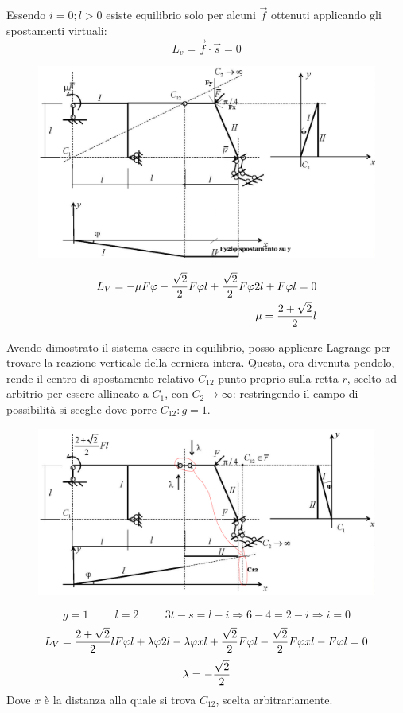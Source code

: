 \documentclass{article}
\begin{document}
\begin{adjustwidth}{2in}{}
 Essendo $i = 0; l>0$ esiste equilibrio solo per alcuni $\vec{f}$ ottenuti applicando gli spostamenti virtuali: 
 \[L_v = \vec{f}\cdot\vec{s} = 0\]
 
 \begin{figure}[H]
 	\centering
 	\includegraphics[width=0.5\linewidth]{immagini/1.PARTE4_Pagina_21}
 \end{figure}
 
 \begin{eqnarray*} L_V = -\mu F\varphi - {\sqrt{2}\over2}F\varphi l + {\sqrt{2}\over2}F\varphi 2l + F\varphi l = 0 \\
 \mu = \dfrac{2+\sqrt{2}}{2}l 
\end{eqnarray*}

Avendo dimostrato il sistema essere in equilibrio, posso applicare Lagrange per trovare la reazione verticale della cerniera intera. 
\newpage
Questa, ora divenuta pendolo, rende il centro di spostamento relativo $C_{12}$ punto proprio sulla retta $r$, scelto ad arbitrio per essere allineato a $C_1$, con $C_2\rightarrow\infty$: restringendo il campo di possibilità si sceglie dove porre  $C_{12}: g = 1$. 

\begin{figure}[H]
	\centering
	\includegraphics[width=0.5\linewidth]{immagini/1.PARTE4_Pagina_22}
\end{figure}

\[ g = 1  \hspace{1cm} l = 2 \hspace{1cm} 3t - s = l - i \Rightarrow 6-4 = 2-i \Rightarrow i = 0\]
\[ L_V = \dfrac{2+\sqrt{2}}{2}l  F\varphi l + \lambda\varphi2l - \lambda\varphi xl + {\sqrt{2}\over2}F\varphi l - {\sqrt{2}\over2}F\varphi xl - F\varphi l = 0 \]
\[\lambda = -{\sqrt{2}\over2} \]
Dove $x$ è la distanza alla quale si trova $C_{12}$, scelta arbitrariamente. \newline 


\end{adjustwidth}
\end{document}
